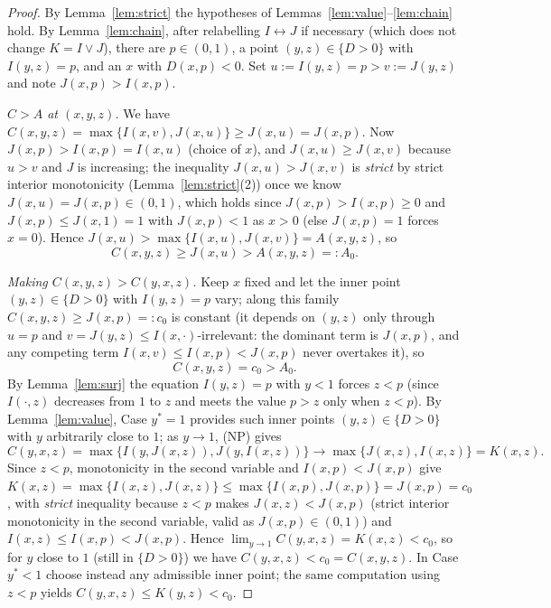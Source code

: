 \documentclass{amsart}
\theoremstyle{plain}
\theoremstyle{definition}
\begin{document}
\begin{proof}
By Lemma~\ref{lem:strict} the hypotheses of Lemmas~\ref{lem:value}--\ref{lem:chain} hold.
By Lemma~\ref{lem:chain}, after relabelling $I\leftrightarrow J$ if necessary (which does
not change $K=I\vee J$), there are $p\in(0,1)$, a point $(y,z)\in\{D>0\}$ with $I(y,z)=p$,
and an $x$ with $D(x,p)<0$.  Set $u:=I(y,z)=p>v:=J(y,z)$ and note $J(x,p)>I(x,p)$.

\emph{$C>A$ at $(x,y,z)$.}  We have
$C(x,y,z)=\max\{I(x,v),J(x,u)\}\ge J(x,u)=J(x,p)$.  Now
$J(x,p)>I(x,p)=I(x,u)$ (choice of $x$), and $J(x,u)\ge J(x,v)$ because $u>v$ and $J$ is
increasing; the inequality $J(x,u)>J(x,v)$ is \emph{strict} by strict interior
monotonicity (Lemma~\ref{lem:strict}(2)) once we know $J(x,u)=J(x,p)\in(0,1)$, which holds
since $J(x,p)>I(x,p)\ge0$ and $J(x,p)\le J(x,1)=1$ with $J(x,p)<1$ as $x>0$ (else
$J(x,p)=1$ forces $x=0$).  Hence $J(x,u)>\max\{I(x,u),J(x,v)\}=A(x,y,z)$, so
\begin{equation}\label{eq:CgtA}
C(x,y,z)\ge J(x,u)>A(x,y,z)=:A_0 .
\end{equation}

\emph{Making $C(x,y,z)>C(y,x,z)$.}  Keep $x$ fixed and let the inner point $(y,z)\in\{D>0\}$
with $I(y,z)=p$ vary; along this family $C(x,y,z)\ge J(x,p)=:c_0$ is constant (it depends
on $(y,z)$ only through $u=p$ and $v=J(y,z)\le I(x,\cdot)$-irrelevant: the dominant term is
$J(x,p)$, and any competing term $I(x,v)\le I(x,p)<J(x,p)$ never overtakes it), so
\begin{equation}\label{eq:Cconst}
C(x,y,z)=c_0>A_0 .
\end{equation}
By Lemma~\ref{lem:surj} the equation $I(y,z)=p$ with $y<1$ forces $z<p$ (since
$I(\cdot,z)$ decreases from $1$ to $z$ and meets the value $p>z$ only when $z<p$).  By
Lemma~\ref{lem:value}, Case $y^\ast=1$ provides such inner points $(y,z)\in\{D>0\}$ with
$y$ arbitrarily close to $1$; as $y\to1$, (NP) gives
\[
C(y,x,z)=\max\{I(y,J(x,z)),J(y,I(x,z))\}\longrightarrow
\max\{J(x,z),I(x,z)\}=K(x,z).
\]
Since $z<p$, monotonicity in the second variable and $I(x,p)<J(x,p)$ give
$K(x,z)=\max\{I(x,z),J(x,z)\}\le\max\{I(x,p),J(x,p)\}=J(x,p)=c_0$, with \emph{strict}
inequality because $z<p$ makes $J(x,z)<J(x,p)$ (strict interior monotonicity in the second
variable, valid as $J(x,p)\in(0,1)$) and $I(x,z)\le I(x,p)<J(x,p)$.  Hence
$\lim_{y\to1}C(y,x,z)=K(x,z)<c_0$, so for $y$ close to $1$ (still in $\{D>0\}$) we have
$C(y,x,z)<c_0=C(x,y,z)$.  In Case $y^\ast<1$ choose instead any admissible inner point;
the same computation using $z<p$ yields $C(y,x,z)\le K(y,z)<c_0$.


\end{proof}
\end{document}
